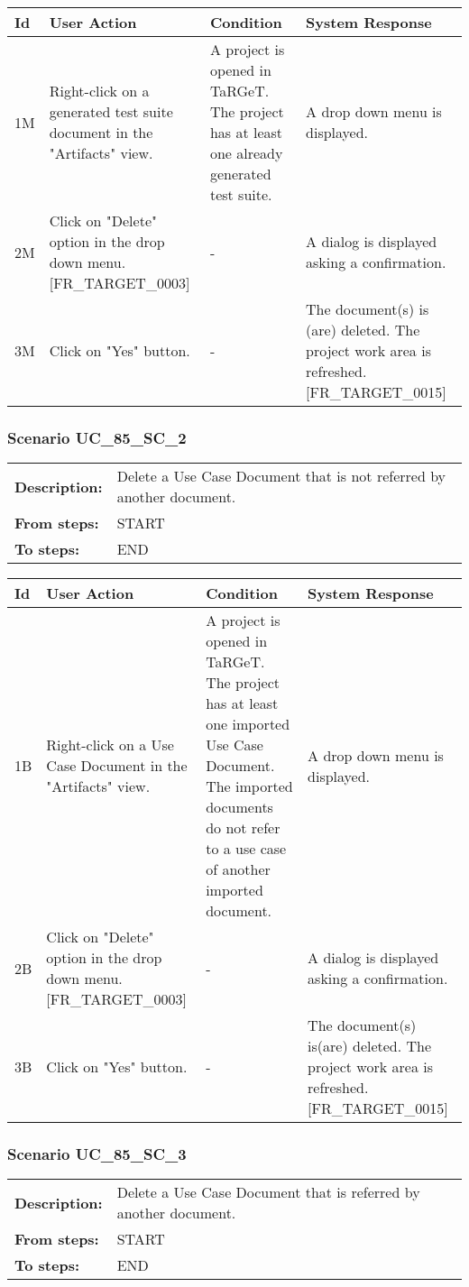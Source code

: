 \documentclass[a4paper,11pt]{article}
\newcommand{\bl}{\\ \hline}
\begin{document}
\begin{tabular}{|p{0.8in}|p{1.6in}|p{1.6in}|p{1.6in}|}
\hline
Id & User Action & Condition & System Response  \bl 
1M & Right-click on a generated test suite document in the "Artifacts" view. & A project is opened in TaRGeT. The project has at least one already generated test suite. & A drop down menu is displayed. \bl 
2M & Click on "Delete" option in the drop down menu. [FR_TARGET_0003] & - & A dialog is displayed asking a confirmation. \bl 
3M & Click on "Yes" button. & - & The document(s) is (are) deleted. The project work area is refreshed. [FR_TARGET_0015] \bl 
\end{tabular}
\subsubsection*{Scenario UC_85_SC_2}
\begin{tabular}{p{1in}p{4in}}
{\bf Description:} & Delete a Use Case Document that is not referred by another document. \\
{\bf From steps:} & START \\
{\bf To steps:} & END \\
\end{tabular}
 
\begin{tabular}{|p{0.8in}|p{1.6in}|p{1.6in}|p{1.6in}|}
\hline
Id & User Action & Condition & System Response  \bl 
1B & Right-click on a Use Case Document in the "Artifacts" view. & A project is opened in TaRGeT. The project has at least one imported Use Case Document. The imported documents do not refer to a use case of another imported document. & A drop down menu is displayed. \bl 
2B & Click on "Delete" option in the drop down menu. [FR_TARGET_0003] & - & A dialog is displayed asking a confirmation. \bl 
3B & Click on "Yes" button. & - & The document(s) is(are) deleted. The project work area is refreshed. [FR_TARGET_0015] \bl 
\end{tabular}
\subsubsection*{Scenario UC_85_SC_3}
\begin{tabular}{p{1in}p{4in}}
{\bf Description:} & Delete a Use Case Document that is referred by another document. \\
{\bf From steps:} & START \\
{\bf To steps:} & END \\
\end{tabular}
 
\end{document}
